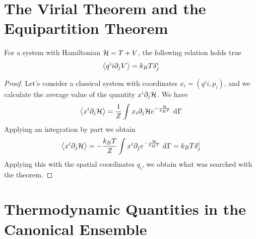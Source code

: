 \documentclass[../qm.tex]{subfiles}
\begin{document}
		\section{The Virial Theorem and the Equipartition Theorem}
		\begin{thm}
			For a system with Hamiltonian $\mathcal{H}=T+V$, the following relation holds true
			\begin{equation}
				\expval{q^ii\partial_jV}=k_BT\delta_j^i
				\label{eq:virialtheoremclassical}
			\end{equation}
		\end{thm}
		\begin{proof}
			Let's consider a classical system with coordinates $x_i=(q^ii,p_i)$, and we calculate the average value of the quantity $x^i\partial_j\mathcal{H}$. We have
			\begin{equation*}
				\expval{x^i\partial_j\mathcal{H}}=\frac{1}{Z}\int_{}^{}x_i\partial_j\mathcal{H} e^{-\frac{\mathcal{H}}{k_BT}}\ \mathrm{d}^{}\Gamma
			\end{equation*}
			Applying an integration by part we obtain
			\begin{equation}
				\expval{x^i\partial_j\mathcal{H}}=-\frac{k_BT}{Z}\int_{}^{}x^i\partial_je^{-\frac{\mathcal{H}}{k_BT}}\ \mathrm{d}^{}\Gamma=k_BT\delta_{j}^i
				\label{eq:virialtheoremcomplete}
			\end{equation}
			Applying this with the spatial coordinates $q_i$, we obtain what was searched with the theorem.
		\end{proof}
		\section{Thermodynamic Quantities in the Canonical Ensemble}
\end{document}
